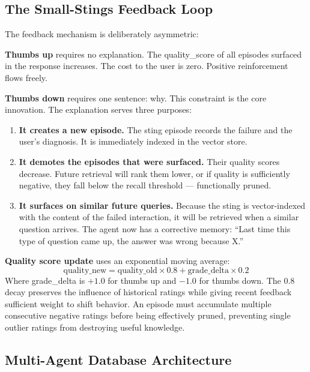 \documentclass[11pt,a4paper]{article}
\begin{document}
\subsection{The Small-Stings Feedback Loop}

The feedback mechanism is deliberately asymmetric:

\textbf{Thumbs up} requires no explanation. The quality\_score of all episodes surfaced in the response increases. The cost to the user is zero. Positive reinforcement flows freely.

\textbf{Thumbs down} requires one sentence: why. This constraint is the core innovation. The explanation serves three purposes:

\begin{enumerate}
    \item \textbf{It creates a new episode.} The sting episode records the failure and the user's diagnosis. It is immediately indexed in the vector store.

    \item \textbf{It demotes the episodes that were surfaced.} Their quality scores decrease. Future retrieval will rank them lower, or if quality is sufficiently negative, they fall below the recall threshold --- functionally pruned.

    \item \textbf{It surfaces on similar future queries.} Because the sting is vector-indexed with the content of the failed interaction, it will be retrieved when a similar question arrives. The agent now has a corrective memory: ``Last time this type of question came up, the answer was wrong because X.''
\end{enumerate}

\textbf{Quality score update} uses an exponential moving average:
\begin{equation}
    \text{quality\_new} = \text{quality\_old} \times 0.8 + \text{grade\_delta} \times 0.2
\end{equation}
Where grade\_delta is $+1.0$ for thumbs up and $-1.0$ for thumbs down. The 0.8 decay preserves the influence of historical ratings while giving recent feedback sufficient weight to shift behavior. An episode must accumulate multiple consecutive negative ratings before being effectively pruned, preventing single outlier ratings from destroying useful knowledge.

\subsection{Multi-Agent Database Architecture}
\end{document}
